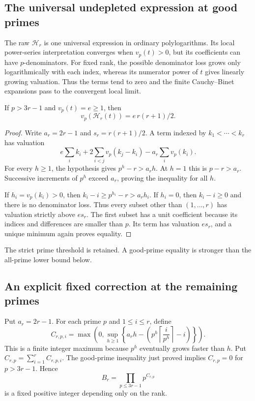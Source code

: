 \subsection{The universal undepleted expression at good primes}
The raw $\mathcal H_r$ is one universal expression in ordinary polylogarithms. Its local power-series interpretation converges when $v_p(t)>0$, but its coefficients can have $p$-denominators. For fixed rank, the possible denominator loss grows only logarithmically with each index, whereas its numerator power of $t$ gives linearly growing valuation. Thus the terms tend to zero and the finite Cauchy--Binet expansions pass to the convergent local limit.
\begin{theorem}\label{thm:good-valuation}
If $p>3r-1$ and $v_p(t)=e\ge1$, then
\[
 v_p(\mathcal H_r(t))=e\,r(r+1)/2.
\]
\end{theorem}
\begin{proof}
Write $a_r=2r-1$ and $s_r=r(r+1)/2$. A term indexed by $k_1<\cdots<k_r$ has valuation
\[
 e\sum_i k_i+2\sum_{i<j}v_p(k_j-k_i)-a_r\sum_i v_p(k_i).
\]
For every $h\ge1$, the hypothesis gives $p^h-r>a_rh$. At $h=1$ this is $p-r>a_r$. Successive increments of $p^h$ exceed $a_r$, proving the inequality for all $h$.

If $h_i=v_p(k_i)>0$, then $k_i-i\ge p^{h_i}-r>a_rh_i$. If $h_i=0$, then $k_i-i\ge0$ and there is no denominator loss. Thus every subset other than $(1,\ldots,r)$ has valuation strictly above $es_r$. The first subset has a unit coefficient because its indices and differences are smaller than $p$. Its term has valuation $es_r$, and a unique minimum again proves equality.
\end{proof}
The strict prime threshold is retained. A good-prime equality is stronger than the all-prime lower bound below.

\subsection{An explicit fixed correction at the remaining primes}
Put $a_r=2r-1$. For each prime $p$ and $1\le i\le r$, define
\[
 C_{r,p,i}=\max\!\left(0,\sup_{h\ge1}\left\{
 a_rh-\left(p^h\left\lceil\frac i{p^h}\right\rceil-i\right)\right\}\right).
\]
This is a finite integer maximum because $p^h$ eventually grows faster than $h$. Put $C_{r,p}=\sum_{i=1}^rC_{r,p,i}$. The good-prime inequality just proved implies $C_{r,p}=0$ for $p>3r-1$. Hence
\[
 B_r=\prod_{p\le3r-1}p^{C_{r,p}}
\]
is a fixed positive integer depending only on the rank.

